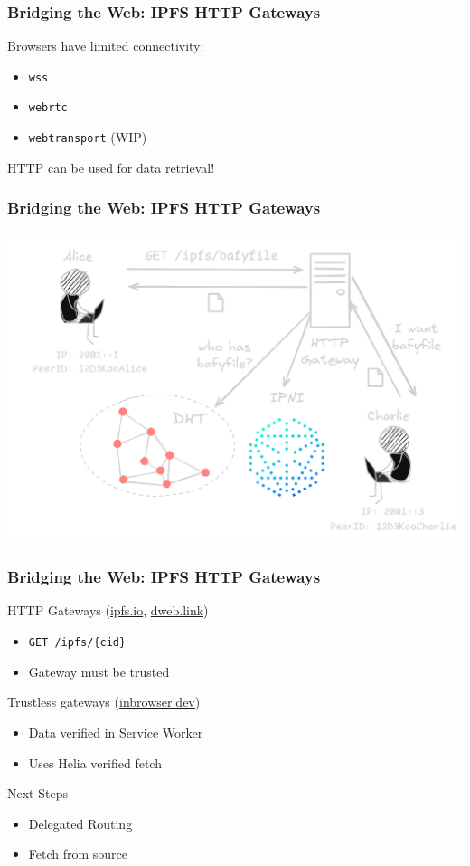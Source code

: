 \documentclass{../shipyard-slide}
\begin{document}
\begin{frame}
  \frametitle{Bridging the Web: IPFS HTTP Gateways}
  \begin{itemize}
    \itemc Browsers have limited connectivity:
    \begin{itemize}
      \item[\greencube] \texttt{wss}
      \item[\greencube] \texttt{webrtc}
      \item[\greencube] \texttt{webtransport} (WIP)
    \end{itemize}
    \itemc HTTP can be used for data retrieval!
  \end{itemize}
\end{frame}
\begin{frame}
  \frametitle{Bridging the Web: IPFS HTTP Gateways}
  \begin{center}
    \includegraphics[width=.7\textwidth]{resources/routing-gateway.png}
  \end{center}
\end{frame}
\begin{frame}
  \frametitle{Bridging the Web: IPFS HTTP Gateways}
  \begin{itemize}
    \itemc HTTP Gateways (\href{https://ipfs.io}{ipfs.io}, \href{https://dweb.link}{dweb.link})
    \begin{itemize}
      \item[\greencube] \texttt{GET /ipfs/\{cid\}}
      \item[\greencube] Gateway must be trusted
    \end{itemize}
    \itemc Trustless gateways (\url{inbrowser.dev})
    \begin{itemize}
      \item[\greencube] Data verified in Service Worker
      \item[\greencube] Uses Helia verified fetch
    \end{itemize}
    \itemc Next Steps
    \begin{itemize}
      \item[\greencube] Delegated Routing
      \item[\greencube] Fetch from source
    \end{itemize}
  \end{itemize}
\end{frame}
\end{document}
